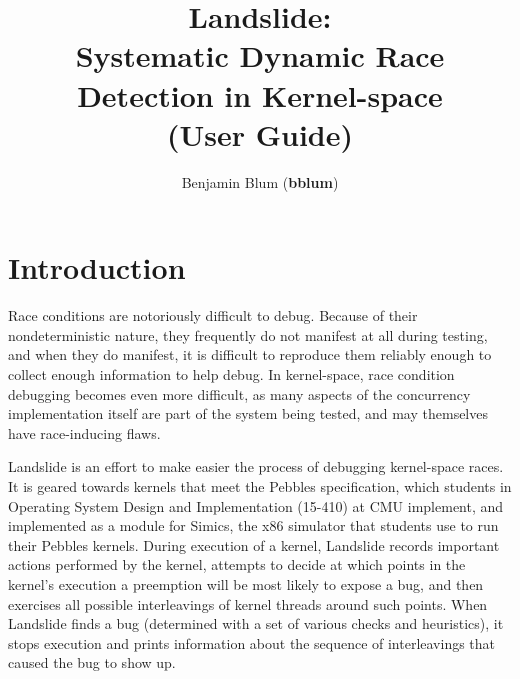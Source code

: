 \documentclass{article}
\begin{document}
\captionsetup{width=.75\textwidth,font=small,labelfont=bf}
\title{\bf Landslide: \\ Systematic Dynamic Race Detection in Kernel-space \\ (User Guide)}
\author{Benjamin Blum (\textbf{bblum})}
\maketitle

\newcommand\true{\;\textit{true}}
\newcommand\false{\;\textit{false}}

\newcommand\alpher\alpha
\newcommand\beter\beta
\newcommand\gammer\gamma
\newcommand\delter\delta
\newcommand\zeter\zeta
\newcommand\Sigmer\Sigma

\newcommand\NN{\mathbb{N}}
\newcommand\QQ{\mathbb{Q}}
\newcommand\RR{\mathbb{R}}
\newcommand\ZZ{\mathbb{Z}}

\begin{abstract}
\end{abstract}

\section{Introduction}

Race conditions are notoriously difficult to debug.
Because of their nondeterministic nature, they frequently do not manifest at all during testing, and when they do manifest, it is difficult to reproduce them reliably enough to collect enough information to help debug.
In kernel-space, race condition debugging becomes even more difficult, as many aspects of the concurrency implementation itself are part of the system being tested, and may themselves have race-inducing flaws.

Landslide is an effort to make easier the process of debugging kernel-space races.
It is geared towards kernels that meet the Pebbles specification, which students in Operating System Design and Implementation (15-410) at CMU implement, and implemented as a module for Simics, the x86 simulator that students use to run their Pebbles kernels.
During execution of a kernel, Landslide records important actions performed by the kernel, attempts to decide at which points in the kernel's execution a preemption will be most likely to expose a bug, and then exercises all possible interleavings of kernel threads around such points.
When Landslide finds a bug (determined with a set of various checks and heuristics), it stops execution and prints information about the sequence of interleavings that caused the bug to show up.
\end{document}
